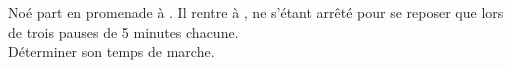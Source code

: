 \begin{exercice*}
   Noé part en promenade à . Il rentre à , ne s'étant arrêté pour se reposer que lors de trois pauses de 5 minutes chacune. \\
   Déterminer son temps de marche.
\end{exercice*}